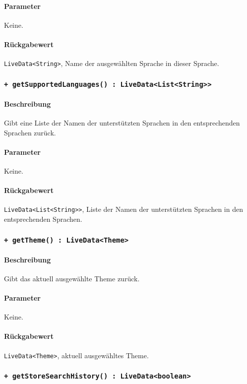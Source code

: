 \paragraph*{Parameter}
Keine.
\paragraph*{Rückgabewert}
\texttt{LiveData<String>}, Name der ausgewählten Sprache in dieser Sprache.

\subsubsection*{\texttt{+ getSupportedLanguages() : LiveData<List<String>>}}%
\paragraph*{Beschreibung}
Gibt eine Liste der Namen der unterstützten Sprachen in den entsprechenden Sprachen zurück.
\paragraph*{Parameter}
Keine.
\paragraph*{Rückgabewert}
\texttt{LiveData<List<String>>}, Liste der Namen der unterstützten Sprachen in den entsprechenden Sprachen.

\subsubsection*{\texttt{+ getTheme() : LiveData<Theme>}}%
\paragraph*{Beschreibung}
Gibt das aktuell ausgewählte Theme zurück.
\paragraph*{Parameter}
Keine.
\paragraph*{Rückgabewert}
\texttt{LiveData<Theme>}, aktuell ausgewähltes Theme.

\subsubsection*{\texttt{+ getStoreSearchHistory() : LiveData<boolean>}}%
